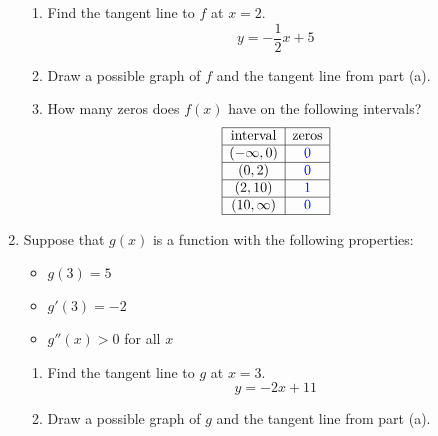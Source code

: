 \documentclass[11pt]{article}
\begin{document}
\begin{enumerate}
  \begin{enumerate}
  \item Find the tangent line to $f$ at $x=2$.
    \vfill
    {\color{blue}
      \[
      y = -\frac{1}{2} x + 5
      \]
    }
    \vfill
  \item Draw a possible graph of $f$ and the tangent line from part
    (a).
    \vfill
    {\color{blue}
      \begin{center}
      \end{center}
    }
    \vfill
  \item How many zeros does $f(x)$ have on the following intervals?
   \[
     \begin{array}{|c|c|}
       \hline
       \mbox{interval} & \mbox{zeros}\\
       \hline
       (-\infty,0)&{\color{blue} 0}\\
       \hline
       (0,2)&{\color{blue} 0}\\
       \hline
       (2,10)&{\color{blue} 1}\\
       \hline
       (10,\infty)&{\color{blue} 0}\\
       \hline
     \end{array}
   \]
   \end{enumerate}
  \newpage
\item Suppose that $g(x)$ is a function with the following
   properties:
  \begin{itemize}
  \item $g(3)=5$
  \item $g'(3)=-2$
  \item $g''(x)>0$ for all $x$
  \end{itemize}

  \begin{enumerate}
  \item Find the tangent line to $g$ at $x=3$.
    \vfill
    {\color{blue}
      \[
      y = -2x + 11
      \]
    }
    \vfill
  \item Draw a possible graph of $g$ and the tangent line from part
    (a).
    \vfill
    {\color{blue}
      \begin{center}
\end{center}}
\end{enumerate}
\end{enumerate}
\end{document}
